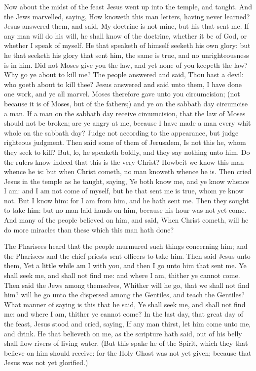  Now about the midst of the feast Jesus went up into the
temple, and taught.  And the Jews marvelled, saying, How
knoweth this man letters, having never learned?  Jesus
answered them, and said, My doctrine is not mine, but his that sent me.
 If any man will do his will, he shall know of the
doctrine, whether it be of God, or whether I speak of myself.
 He that speaketh of himself seeketh his own glory: but he
that seeketh his glory that sent him, the same is true, and no
unrighteousness is in him.  Did not Moses give you the law,
and yet none of you keepeth the law? Why go ye about to kill me?
 The people answered and said, Thou hast a devil: who goeth
about to kill thee?  Jesus answered and said unto them, I
have done one work, and ye all marvel.  Moses therefore
gave unto you circumcision; (not because it is of Moses, but of the
fathers;) and ye on the sabbath day circumcise a man.  If a
man on the sabbath day receive circumcision, that the law of Moses
should not be broken; are ye angry at me, because I have made a man
every whit whole on the sabbath day?  Judge not according
to the appearance, but judge righteous judgment.  Then said
some of them of Jerusalem, Is not this he, whom they seek to kill?
 But, lo, he speaketh boldly, and they say nothing unto
him. Do the rulers know indeed that this is the very Christ?
 Howbeit we know this man whence he is: but when Christ
cometh, no man knoweth whence he is.  Then cried Jesus in
the temple as he taught, saying, Ye both know me, and ye know whence I
am: and I am not come of myself, but he that sent me is true, whom ye
know not.  But I know him: for I am from him, and he hath
sent me.  Then they sought to take him: but no man laid
hands on him, because his hour was not yet come.  And many
of the people believed on him, and said, When Christ cometh, will he do
more miracles than these which this man hath done?

 The Pharisees heard that the people murmured such things
concerning him; and the Pharisees and the chief priests sent officers to
take him.  Then said Jesus unto them, Yet a little while am
I with you, and then I go unto him that sent me.  Ye shall
seek me, and shall not find me: and where I am, thither ye cannot come.
 Then said the Jews among themselves, Whither will he go,
that we shall not find him? will he go unto the dispersed among the
Gentiles, and teach the Gentiles?  What manner of saying is
this that he said, Ye shall seek me, and shall not find me: and where I
am, thither ye cannot come?  In the last day, that great
day of the feast, Jesus stood and cried, saying, If any man thirst, let
him come unto me, and drink.  He that believeth on me, as
the scripture hath said, out of his belly shall flow rivers of living
water.  (But this spake he of the Spirit, which they that
believe on him should receive: for the Holy Ghost was not yet given;
because that Jesus was not yet glorified.)

